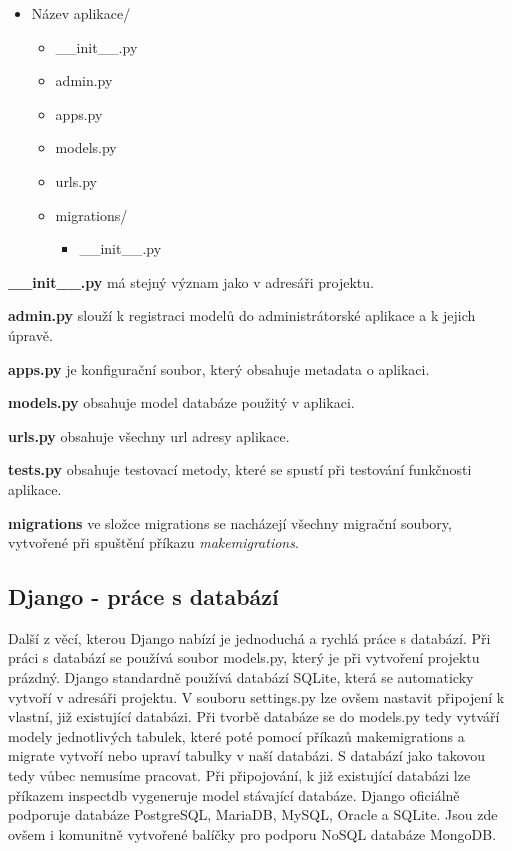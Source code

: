 \begin{itemize}
	\item \lbrack Název aplikace\rbrack /
 	\begin{itemize}
 		\item \_\_init\_\_.py
		\item admin.py
		\item apps.py
		\item models.py
		\item urls.py
		\item \lbrack migrations\rbrack /
		\begin{itemize}
			\item \_\_init\_\_.py
		\end{itemize}
	\end{itemize}
\end{itemize}

\vspace{9px}

\textbf{\_\_init\_\_.py} má stejný význam jako v adresáři projektu. 
\vspace{6px}

\textbf{admin.py} slouží k registraci modelů do administrátorské
aplikace a k jejich úpravě.  \vspace{6px}

\textbf{apps.py} je konfigurační soubor, který obsahuje metadata o 
aplikaci.
\vspace{6px}

\textbf{models.py} obsahuje model databáze použitý v aplikaci.
\vspace{6px}

\textbf{urls.py} obsahuje všechny url adresy aplikace.
\vspace{6px}

\textbf{tests.py} obsahuje testovací metody, které se spustí při
testování funkčnosti aplikace.
\vspace{6px}

\textbf{migrations} ve složce migrations se nacházejí všechny migrační
soubory, vytvořené při spuštění příkazu \textit{makemigrations}.

\newpage

\subsection{Django - práce s databází}


Další z věcí, kterou Django nabízí je jednoduchá a rychlá
práce s databází. Při práci s databází se používá soubor models.py,
který je při vytvoření projektu prázdný. Django standardně používá
databází SQLite, která se automaticky vytvoří v adresáři projektu. V
souboru settings.py lze ovšem nastavit připojení k vlastní, již
existující databázi. Při tvorbě databáze se do models.py tedy vytváří
modely jednotlivých tabulek, které poté pomocí příkazů makemigrations
a migrate vytvoří nebo upraví tabulky v naší databázi. S databází jako
takovou tedy vůbec nemusíme pracovat. Při připojování, k již
existující databázi lze příkazem inspectdb vygeneruje model stávající
databáze. Django oficiálně podporuje databáze PostgreSQL, MariaDB,
MySQL, Oracle a SQLite. Jsou zde ovšem i komunitně vytvořené balíčky
pro podporu NoSQL databáze MongoDB. \cite{django}

